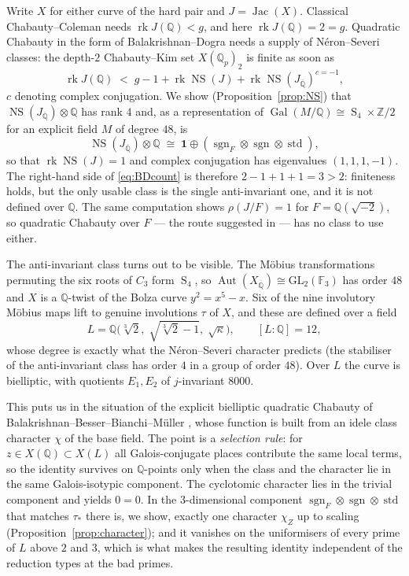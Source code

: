 \documentclass[11pt,reqno]{amsart}
\theoremstyle{plain}
\theoremstyle{definition}
\newcommand{\Q}{\mathbb{Q}}
\newcommand{\Z}{\mathbb{Z}}
\newcommand{\FF}{\mathbb{F}}
\newcommand{\Qbar}{\overline{\Q}}
\DeclareMathOperator{\NS}{NS}
\DeclareMathOperator{\rk}{rk}
\DeclareMathOperator{\Aut}{Aut}
\DeclareMathOperator{\Jac}{Jac}
\DeclareMathOperator{\Gal}{Gal}
\DeclareMathOperator{\sgn}{sgn}
\DeclareMathOperator{\stdrep}{std}
\DeclareMathOperator{\Sym}{S}
\numberwithin{equation}{section}
\begin{document}
Write $X$ for either curve of the hard pair and $J=\Jac(X)$. Classical
Chabauty--Coleman needs $\rk J(\Q)<g$, and here $\rk J(\Q)=2=g$. Quadratic
Chabauty in the form of Balakrishnan--Dogra \cite{BDii} needs a supply of
N\'eron--Severi classes: the depth-$2$ Chabauty--Kim set $X(\Q_{p})_{2}$ is
finite as soon as
\begin{equation}\label{eq:BDcount}
  \rk J(\Q) \;<\; g-1+\rk\NS(J)+\rk\NS(J_{\Qbar})^{c=-1},
\end{equation}
$c$ denoting complex conjugation. We show (Proposition~\ref{prop:NS}) that
$\NS(J_{\Qbar})\otimes\Q$ has rank $4$ and, as a representation of
$\Gal(M/\Q)\cong \Sym_{4}\times\Z/2$ for an explicit field $M$ of degree $48$,
is
\[
  \NS(J_{\Qbar})\otimes\Q \;\cong\; \mathbf{1}\oplus(\sgn_{F}\otimes\sgn\otimes\stdrep),
\]
so that $\rk\NS(J)=1$ and complex conjugation has eigenvalues $(1,1,1,-1)$. The
right-hand side of \eqref{eq:BDcount} is therefore $2-1+1+1=3>2$: finiteness
holds, but the only usable class is the single anti-invariant one, and it is
not defined over $\Q$. The same computation shows $\rho(J/F)=1$ for
$F=\Q(\sqrt{-2})$, so quadratic Chabauty over $F$ --- the route suggested in
\cite{Villines} --- has no class to use either.

The anti-invariant class turns out to be visible. The M\"obius transformations
permuting the six roots of $C_{3}$ form $\Sym_{4}$, so $\Aut(X_{\Qbar})\cong
\mathrm{GL}_{2}(\FF_{3})$ has order $48$ and $X$ is a $\Q$-twist of the Bolza
curve $y^{2}=x^{5}-x$. Six of the nine involutory M\"obius maps lift to genuine
involutions $\tau$ of $X$, and these are defined over a field
\[
  L=\Q\bigl(\sqrt[3]{2},\;\sqrt{\sqrt[3]{2}-1},\;\sqrt{\kappa}\bigr),
  \qquad [L:\Q]=12,
\]
whose degree is exactly what the N\'eron--Severi character predicts (the
stabiliser of the anti-invariant class has order $4$ in a group of order $48$).
Over $L$ the curve is bielliptic, with quotients $E_{1},E_{2}$ of $j$-invariant
$8000$.

This puts us in the situation of the explicit bielliptic quadratic Chabauty of
Balakrishnan--Besser--Bianchi--M\"uller \cite{BBBM}, whose function is built
from an idele class character $\chi$ of the base field. The point is a
\emph{selection rule}: for $z\in X(\Q)\subset X(L)$ all Galois-conjugate places
contribute the same local terms, so the identity survives on $\Q$-points only
when the class and the character lie in the same Galois-isotypic component. The
cyclotomic character lies in the trivial component and yields $0=0$. In the
$3$-dimensional component $\sgn_{F}\otimes\sgn\otimes\stdrep$ that matches
$\tau_{*}$ there is, we show, exactly one character $\chi_{Z}$ up to scaling
(Proposition~\ref{prop:character}); and it vanishes on the uniformisers of every
prime of $L$ above $2$ and $3$, which is what makes the resulting identity
independent of the reduction types at the bad primes.
\end{document}
